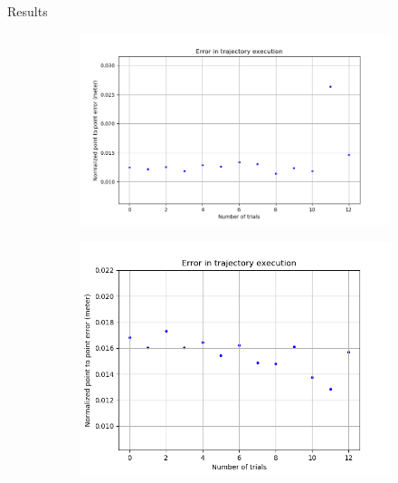 \documentclass{beamer}
\begin{document}
	\begin{frame}{Results}
		\begin{figure}
			\begin{subfigure}[b]{0.49\linewidth}
				\includegraphics[scale=0.25]{images/HSR_3/sequence_0_e.png}
			\end{subfigure}
			\begin{subfigure}[b]{0.49\linewidth}
				\includegraphics[scale=0.25]{images/HSR_3/sequence_1_e.png}
			\end{subfigure}	
		\end{figure}
	\end{frame}
\end{document}
